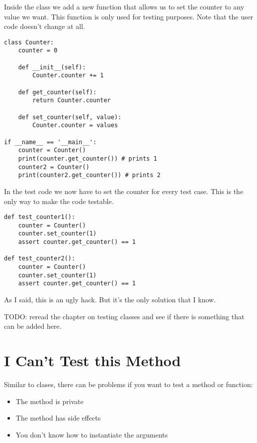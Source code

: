 Inside the class  we add a new function  that allows us to set the counter to any value we want. This function is only used for testing purposes. Note that the user code doesn't change at all.

\begin{programcode}{}
\begin{verbatim}
class Counter:
    counter = 0

    def __init__(self):
        Counter.counter += 1

    def get_counter(self):
        return Counter.counter

    def set_counter(self, value):
        Counter.counter = values

if __name__ == '__main__':
    counter = Counter()
    print(counter.get_counter()) # prints 1
    counter2 = Counter()
    print(counter2.get_counter()) # prints 2
\end{verbatim}
\end{programcode}

In the test code we now have to set the counter for every test case. This is the only way to make the code testable.

\begin{programcode}{}
\begin{verbatim}
def test_counter1():
    counter = Counter()
    counter.set_counter(1)
    assert counter.get_counter() == 1

def test_counter2():
    counter = Counter()
    counter.set_counter(1)
    assert counter.get_counter() == 1
\end{verbatim}
\end{programcode}

As I said, this is an ugly hack. But it's the only solution that I know.

TODO: reread the chapter on testing classes and see if there is something that can be added here.

\section{I Can't Test this Method}

Similar to clases, there can be problems if you want to test a method or function:

\begin{itemize}
\item The method is private
\item The method has side effects
\item You don't know how to instantiate the arguments
\end{itemize}

